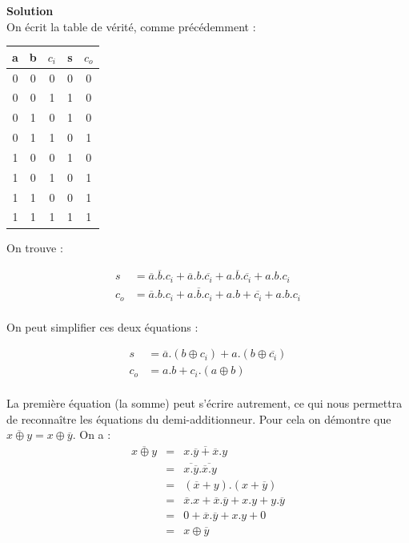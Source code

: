 \documentclass[a4paper,11pt]{article}
\begin{document}
\begin{enumerate}
\begin{cadre}
{\bf Solution}\\
On écrit la table de vérité, comme précédemment :\\
\begin{tabular}{|c|c|c||c|c|}
  \hline
  a & b & $c_i$ & s & $c_o$  \\ \hline
  0 & 0 & 0 & 0 & 0 \\ \hline
  0 & 0 & 1 & 1 & 0 \\ \hline
  0 & 1 & 0 & 1 & 0 \\ \hline
  0 & 1 & 1 & 0 & 1 \\ \hline
  1 & 0 & 0 & 1 & 0 \\ \hline
  1 & 0 & 1 & 0 & 1 \\ \hline
  1 & 1 & 0 & 0 & 1 \\ \hline
  1 & 1 & 1 & 1 & 1 \\ \hline
\end{tabular}
On trouve :

\begin{align*}
  s &= \overline{a} . \overline{b} . c_i  +  \overline{a} . b . \overline{c_i}  +  a . \overline{b} . \overline{c_i}  +  a . b . c_i \\
  c_o &= \overline{a} . b . c_i  +  a . \overline{b} . c_i  +  a . b  +  \overline{c_i}  +  a . b . c_i \\
\end{align*}

On peut simplifier ces deux équations :

\begin{align*}
  s &= \overline{a}.(b \oplus c_i) + a.(b \oplus \overline{c_i}) \\
  c_o &= a.b+c_i.(a \oplus b)\\
\end{align*}

La première équation (la somme) peut s'écrire autrement, ce qui nous permettra de reconnaître les équations du demi-additionneur.
Pour cela on démontre que $\overline{x \oplus y} = x \oplus \overline{y}$. On a :
\begin{eqnarray}
\overline{x \oplus y}  & = & \overline{x.\overline{y}+\overline{x}.y} \nonumber \\
                       & = & \overline{x.\overline{y}}.\overline{\overline{x}.y} \nonumber \\
                       & = & (\overline{x}+y).(x+\overline{y}) \nonumber \\
                       & = & \overline{x}.x+\overline{x}.\overline{y}+x.y+y.\overline{y} \nonumber \\
                       & = & 0 + \overline{x}.\overline{y}+x.y + 0\nonumber \\
                       & = & x \oplus \overline{y} \nonumber
\end{eqnarray}


\end{cadre}
\end{enumerate}
\end{document}

